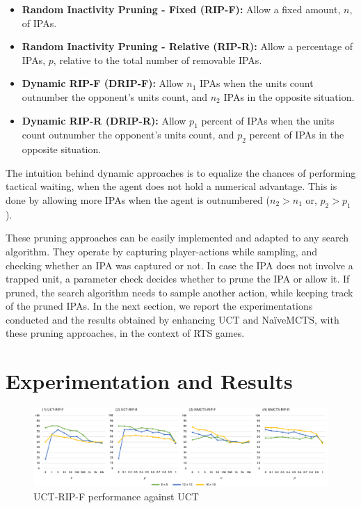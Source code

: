 \documentclass[conference]{IEEEtran}
\begin{document}
\begin{itemize}
\item \textbf{Random Inactivity Pruning - Fixed (RIP-F):} Allow a fixed amount, $n$, of IPAs.
\item \textbf{Random Inactivity Pruning - Relative (RIP-R):} Allow a percentage of IPAs, $p$, relative to the total number of removable IPAs.
\item \textbf{Dynamic RIP-F (DRIP-F):} Allow $n_1$ IPAs when the units count outnumber the opponent's units count, and $n_2$ IPAs in the opposite situation.
\item \textbf{Dynamic RIP-R (DRIP-R):} Allow $p_1$ percent of IPAs when the units count outnumber the opponent's units count, and $p_2$ percent of IPAs in the opposite situation.
\end{itemize}

The intuition behind dynamic approaches is to equalize the chances of performing tactical waiting, when the agent does not hold a numerical advantage. This is done by allowing more IPAs when the agent is outnumbered ($n_2 > n_1$ or, $p_2 > p_1$).

These pruning approaches can be easily implemented and adapted to any search algorithm. They operate by capturing player-actions while sampling, and checking whether an IPA was captured or not. In case the IPA does not involve a trapped unit, a parameter check decides whether to prune the IPA or allow it. If pruned, the search algorithm needs to sample another action, while keeping track of the pruned IPAs. In the next section, we report the experimentations conducted and the results obtained by enhancing UCT and NaïveMCTS, with these pruning approaches, in the context of RTS games.

\section{Experimentation and Results}

\begin{figure}[!h]
\begin{center}
	\includegraphics[width=1\textwidth]{figs/PT-h.pdf}
	\caption{UCT-RIP-F performance against UCT}
	\label{PruningAnalysis}
\end{center}
\end{figure}
\end{document}
